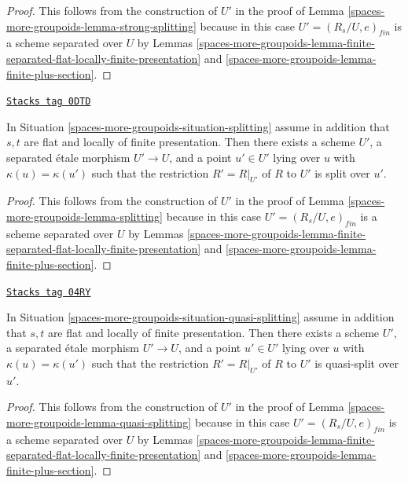 \begin{proof}
This follows from the construction of $U'$ in the proof of
Lemma \ref{spaces-more-groupoids-lemma-strong-splitting}
because in this case $U' = (R_s/U, e)_{fin}$ is a scheme separated over
$U$ by
Lemmas \ref{spaces-more-groupoids-lemma-finite-separated-flat-locally-finite-presentation} and
\ref{spaces-more-groupoids-lemma-finite-plus-section}.
\end{proof}

\begin{lemma}
\label{spaces-more-groupoids-lemma-splitting-scheme}
\href{https://stacks.math.columbia.edu/tag/0DTD}{\texttt{Stacks tag 0DTD}}

In Situation \ref{spaces-more-groupoids-situation-splitting} assume in addition that
$s, t$ are flat and locally of finite presentation.
Then there exists a scheme $U'$, a separated \'etale morphism
$U' \to U$, and a point $u' \in U'$
lying over $u$ with $\kappa(u) = \kappa(u')$
such that the restriction $R' = R|_{U'}$ of $R$ to $U'$
is split over $u'$.
\end{lemma}

\begin{proof}
This follows from the construction of $U'$ in the proof of
Lemma \ref{spaces-more-groupoids-lemma-splitting}
because in this case $U' = (R_s/U, e)_{fin}$ is a scheme separated over
$U$ by
Lemmas \ref{spaces-more-groupoids-lemma-finite-separated-flat-locally-finite-presentation} and
\ref{spaces-more-groupoids-lemma-finite-plus-section}.
\end{proof}

\begin{lemma}
\label{spaces-more-groupoids-lemma-quasi-splitting-scheme}
\href{https://stacks.math.columbia.edu/tag/04RY}{\texttt{Stacks tag 04RY}}

In Situation \ref{spaces-more-groupoids-situation-quasi-splitting} assume in addition that
$s, t$ are flat and locally of finite presentation.
Then there exists a scheme $U'$, a separated \'etale morphism
$U' \to U$, and a point $u' \in U'$ lying over $u$ with
$\kappa(u) = \kappa(u')$ such that the restriction $R' = R|_{U'}$ of
$R$ to $U'$ is quasi-split over $u'$.
\end{lemma}

\begin{proof}
This follows from the construction of $U'$ in the proof of
Lemma \ref{spaces-more-groupoids-lemma-quasi-splitting}
because in this case $U' = (R_s/U, e)_{fin}$ is a scheme separated
over $U$ by
Lemmas \ref{spaces-more-groupoids-lemma-finite-separated-flat-locally-finite-presentation} and
\ref{spaces-more-groupoids-lemma-finite-plus-section}.
\end{proof}

